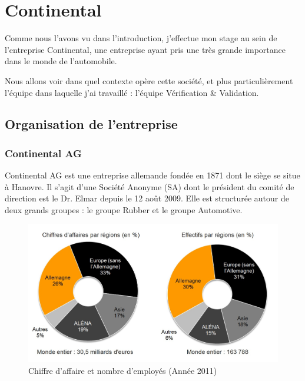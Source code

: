 \chapter{Continental}\label{chapConti}
\begin{figure}
\vspace{-25px}
\hspace{-30px}
\begin{minipage}{0.67\textwidth}
\minitoc
\end{minipage}
\end{figure}
Comme nous l'avons vu dans l'introduction, j'effectue mon stage au sein de l'entreprise Continental, une entreprise ayant pris une très grande importance dans le monde de l'automobile. 

Nous allons voir dans quel contexte opère cette société, et plus particulièrement l'équipe dans laquelle j'ai travaillé : l'équipe Vérification \& Validation.
	\section{Organisation de l'entreprise}
		\subsection{Continental AG}

Continental AG est une entreprise allemande fondée en 1871 dont le siège se situe à Hanovre. Il s'agit d'une Société Anonyme (SA) dont le président du comité de
direction est le Dr. Elmar  depuis le 12 août 2009. Elle est structurée autour de deux grands groupes : le groupe Rubber et le groupe Automotive.
	 
		 \begin{figure}[H]
		 	\centering
		 	\includegraphics[width=12cm]{contents/images/caConti.jpg}
		 	\caption{Chiffre d'affaire et nombre d'employés (Année 2011)}
		 	\label{fig:caConti}
		 \end{figure}

